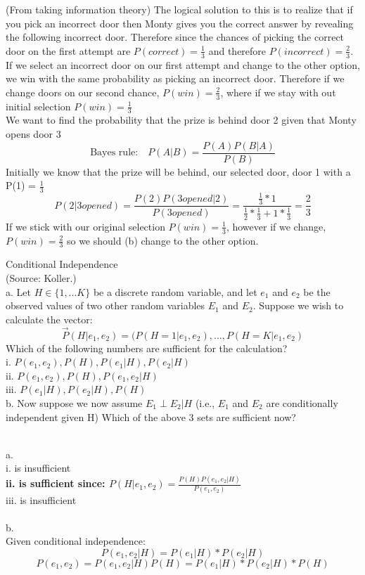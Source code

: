 \documentclass[draft]{exam} %
\theoremstyle{definition} \newtheorem*{defn}{Definition}
\begin{document}
\begin{questions}
\begin{solution}
(From taking information theory) The logical solution to this is to realize that if you pick an incorrect door then Monty gives you the correct answer by revealing the following incorrect door.  Therefore since the chances of picking the correct door on the first attempt are $P(correct) = \frac{1}{3}$ and therefore $P(incorrect) = \frac{2}{3}$.  If we select an incorrect door on our first attempt and change to the other option, we win with the same probability as picking an incorrect door.  Therefore if we change doors on our second chance, $P(win)=\frac{2}{3}$, where if we stay with out initial selection $P(win)=\frac{1}{3}$\\
We want to find the probability that the prize is behind door 2 given that Monty opens door 3\\
$$\text{Bayes rule:} \quad P(A|B) =\frac{P(A)P(B|A)}{P(B)} $$
Initially we know that the prize will be behind, our selected door, door 1 with a P(1) = $\frac{1}{3}$
$$P(2|3opened)=\frac{P(2)P(3opened|2)}{P(3opened)}=\frac{\frac{1}{3}*1}{\frac{1}{2}*\frac{1}{3}+1*\frac{1}{3}}=\frac{2}{3}$$
If we stick with our original selection $P(win)= \frac{1}{3}$, however if we change, $P(win)=\frac{2}{3}$ so we should (b) change to the other option.
\end{solution} %

 Conditional Independence\\
(Source: Koller.)\\
a. Let $H \in \{1,...K\}$ be a discrete random variable, and let $e_1$ and $e_2$ be the observed values of two other random variables $E_1$ and $E_2$.  Suppose we wish to calculate the vector:
$$\vec{P}(H|e_1,e_2)=(P(H=1|e_1,e_2),...,P(H=K|e_1,e_2)$$
Which of the following numbers are sufficient for the calculation?\\
i. $P(e_1,e_2), P(H), P(e_1|H), P(e_2|H)$\\
ii. $P(e_1,e_2), P(H), P(e_1, e_2 | H)$\\
iii. $P(e_1|H), P(e_2|H), P(H)$\\
b. Now suppose we now assume $E_1 \perp E_2 | H$ (i.e., $E_1$ and $E_2$ are conditionally independent given H)  Which of the above 3 sets are sufficient now?

\begin{solution} \\%
a.\\
i. is insufficient\\
\textbf{ii. is sufficient since: \quad $P(H|e_1,e_2) =\frac{P(H)P(e_1,e_2|H)}{P(e_1,e_2)}$}\\
iii. is insufficient\\
\\
b.\\
Given conditional independence:\\ 
$$P(e_1,e_2|H)=P(e_1|H)*P(e_2|H)$$
$$P(e_1,e_2) = P(e_1,e_2|H)P(H) = P(e_1|H)*P(e_2|H)*P(H)$$


\end{solution}
\end{questions}
\end{document}
